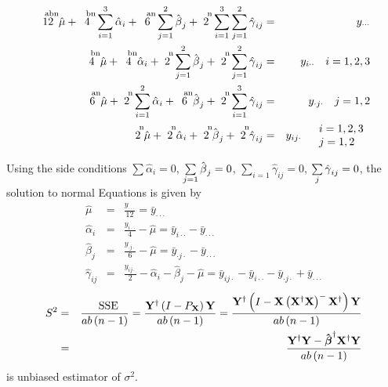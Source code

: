 \documentclass{article}
\begin{document}
\begin{eqnarray*}
\overset{\text{abn}}{12}\hat{\mu}+\overset{\text{bn}}{4}\sum\limits_{i=1}^{3}%
\hat{\alpha}_{i}+\overset{\text{an}}{6}\sum\limits_{j=1}^{2}\hat{\beta}_{j}+%
\overset{\text{n}}{2}\sum\limits_{i=1}^{3}\sum\limits_{j=1}^{2}\hat{\gamma}%
_{ij} &=&y_{\cdot \cdot \cdot } \\
\overset{\text{bn}}{4}\hat{\mu}+\overset{\text{bn}}{4}\hat{\alpha}_{i}+%
\overset{\text{n}}{2}\sum\limits_{j=1}^{2}\hat{\beta}_{j}+\overset{\text{n}}{%
2}\sum\limits_{j=1}^{2}\hat{\gamma}_{ij} &=&y_{i\cdot \cdot }\quad i=1,2,3 \\
\overset{\text{an}}{6}\hat{\mu}+\overset{\text{n}}{2}\sum\limits_{i=1}^{2}%
\hat{\alpha}_{i}+\overset{\text{an}}{6}\hat{\beta}_{j}+\overset{\text{n}}{2}%
\sum\limits_{i=1}^{3}\hat{\gamma}_{ij} &=&y_{\cdot j\cdot }\quad j=1,2 \\
\overset{\text{n}}{2}\hat{\mu}+\overset{\text{n}}{2}\hat{\alpha}_{i}+\overset%
{\text{n}}{2}\hat{\beta}_{j}+\overset{\text{n}}{2}\hat{\gamma}_{ij}
&=&y_{ij\cdot }\quad 
\begin{tabular}{l}
$i=1,2,3$ \\ 
$j=1,2$%
\end{tabular}%
\end{eqnarray*}

Using the side conditions $\sum \hat{\alpha}_{i}=0$, $\sum\limits_{j=1}\hat{%
\beta}_{j}=0$, $\sum\limits_{i=1}\hat{\gamma}_{ij}=0$, $\sum\limits_{j}\hat{%
\gamma}_{ij}=0$, the solution to normal Equations is given by%
\begin{eqnarray*}
\hat{\mu} &=&\frac{y_{\cdot \cdot \cdot }}{12}=\bar{y}_{\cdot \cdot \cdot }
\\
\hat{\alpha}_{i} &=&\frac{y_{i\cdot \cdot }}{4}-\hat{\mu}=\bar{y}_{i\cdot
\cdot }-\bar{y}_{\cdot \cdot \cdot } \\
\hat{\beta}_{j} &=&\frac{y_{\cdot j\cdot }}{6}-\hat{\mu}=\bar{y}_{\cdot
j\cdot }-\bar{y}_{\cdot \cdot \cdot } \\
\hat{\gamma}_{ij} &=&\frac{y_{ij\cdot }}{2}-\hat{\alpha}_{i}-\hat{\beta}_{j}-%
\hat{\mu}=\bar{y}_{ij\cdot }-\bar{y}_{i\cdot \cdot }-\bar{y}_{\cdot j\cdot }+%
\bar{y}_{\cdot \cdot \cdot }
\end{eqnarray*}%
\begin{eqnarray*}
S^{2} &=&\frac{\text{SSE}}{ab\left( n-1\right) }=\frac{\mathbf{Y}^{\dagger
}\left( I-P_{\mathbf{X}}\right) \mathbf{Y}}{ab\left( n-1\right) }=\frac{%
\mathbf{Y}^{\dagger }\left( I-\mathbf{X}\left( \mathbf{X}^{\dagger }\mathbf{X%
}\right) ^{-}\mathbf{X}^{\dagger }\right) \mathbf{Y}}{ab\left( n-1\right) }
\\
&=&\frac{\mathbf{Y}^{\dagger }\mathbf{Y}-\mathbf{\hat{\beta}}^{\dagger }%
\mathbf{X}^{\dagger }\mathbf{Y}}{ab\left( n-1\right) }
\end{eqnarray*}%
is unbiased estimator of $\sigma ^{2}$.
\end{document}
